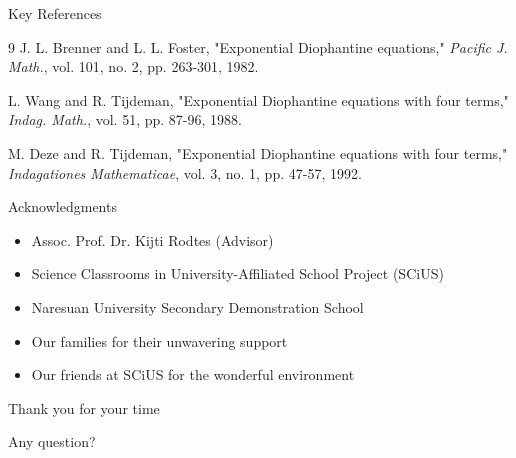 ﻿\documentclass[10pt,aspectratio=169]{beamer}
\begin{document}
\begin{frame}{Key References}
    \begin{thebibliography}{9}
         J. L. Brenner and L. L. Foster, "Exponential Diophantine equations," \textit{Pacific J. Math.}, vol. 101, no. 2, pp. 263-301, 1982.
        
         L. Wang and R. Tijdeman, "Exponential Diophantine equations with four terms," \textit{Indag. Math.}, vol. 51, pp. 87-96, 1988.
        
         M. Deze and R. Tijdeman, "Exponential Diophantine equations with four terms," \textit{Indagationes Mathematicae}, vol. 3, no. 1, pp. 47-57, 1992.
    \end{thebibliography}
\end{frame}

\begin{frame}{Acknowledgments}
    \Large
    \centering
    \begin{itemize}
        \item Assoc. Prof. Dr. Kijti Rodtes (Advisor)
        \item Science Classrooms in University-Affiliated School Project (SCiUS)
        \item Naresuan University Secondary Demonstration School
        \item Our families for their unwavering support
        \item Our friends at SCiUS for the wonderful environment
    \end{itemize}
\end{frame}

\begin{frame}
    \Huge
    \centering
    Thank you for your time
    
    \vspace{1cm}
    \Large
    Any question?
\end{frame}
\end{document}
